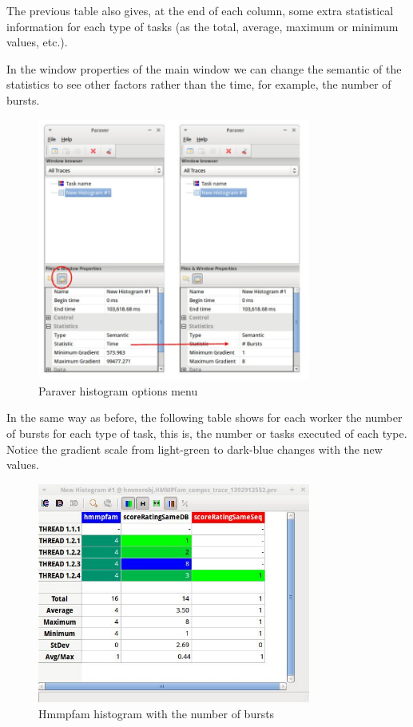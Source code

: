 The previous table also gives, at the end of each column, some extra statistical 
information for each type of tasks (as the total, average, maximum or minimum values, etc.).

\newpage
In the window properties of the main window we can change the semantic of the statistics 
to see other factors rather than the time, for example, the number of bursts.

\begin{figure}[ht!]
  \centering
    \includegraphics[width=0.8\textwidth]{./Sections/5_Analysis/Figures/14.jpeg}
    \caption{Paraver histogram options menu}
\end{figure}

\newpage
In the same way as before, the following table shows for each worker the number of bursts 
for each type of task, this is, the number or tasks executed of each type. Notice the gradient 
scale from light-green to dark-blue changes with the new values.

\begin{figure}[ht!]
  \centering
    \includegraphics[width=0.8\textwidth]{./Sections/5_Analysis/Figures/15.jpeg}
    \caption{Hmmpfam histogram with the number of bursts}
\end{figure}